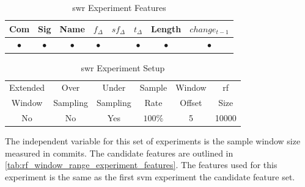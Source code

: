 \begin{table}[h]
\begin{center}

    \begin{tabular}{|c|c|c|c|c|c|c|c|}
        \hline
        Com & Sig & Name & $f_{\Delta}$ & $sf_{\Delta}$ & $t_\Delta$ & Length & $change_{t-1}$ \\
         \hline
        $\bullet$ & $\bullet$ & $\bullet$ & $\bullet$ & & $\bullet$ & $\bullet$ & $\bullet$ \\ \hline
    \end{tabular}
    \caption{\gls{swr} Experiment Features}
    \label{tab:rf_window_range_experiment_features}
\end{center}

\end{table}

\begin{table}[h]
\begin{center}

    \begin{tabular}{|c|c|c|c|c|c|}
        \hline
        Extended & Over & Under & Sample & Window & \gls{rf} \\
        Window & Sampling & Sampling & Rate & Offset & Size \\ \hline
        No & No & Yes & $100\%$ & 5 & 10000 \\ \hline
    \end{tabular}
    \caption{\gls{swr} Experiment Setup}
    \label{tab:rf_window_range_experiment_setup}
\end{center}

\end{table}

The independent variable for this set of experiments is the sample window size measured in commits. The candidate features are outlined in \autoref{tab:rf_window_range_experiment_features}. The features used for this experiment is the same as the first \gls{svm} experiment the candidate feature set.



